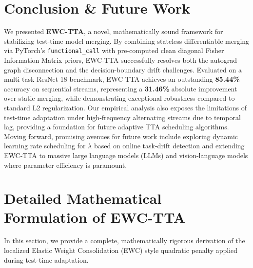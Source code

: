 \documentclass{article}
\theoremstyle{plain}
\theoremstyle{definition}
\theoremstyle{remark}
\begin{document}
\section{Conclusion \& Future Work}
\label{submission-conclusion}

We presented \textbf{EWC-TTA}, a novel, mathematically sound framework for stabilizing test-time model merging. By combining stateless differentiable merging via PyTorch's \texttt{functional\_call} with pre-computed clean diagonal Fisher Information Matrix priors, EWC-TTA successfully resolves both the autograd graph disconnection and the decision-boundary drift challenges. Evaluated on a multi-task ResNet-18 benchmark, EWC-TTA achieves an outstanding \textbf{85.44\%} accuracy on sequential streams, representing a \textbf{31.46\%} absolute improvement over static merging, while demonstrating exceptional robustness compared to standard L2 regularization. Our empirical analysis also exposes the limitations of test-time adaptation under high-frequency alternating streams due to temporal lag, providing a foundation for future adaptive TTA scheduling algorithms. Moving forward, promising avenues for future work include exploring dynamic learning rate scheduling for $\lambda$ based on online task-drift detection and extending EWC-TTA to massive large language models (LLMs) and vision-language models where parameter efficiency is paramount.

\clearpage
\appendix

\section{Detailed Mathematical Formulation of EWC-TTA}
\label{appendix-math}

In this section, we provide a complete, mathematically rigorous derivation of the localized Elastic Weight Consolidation (EWC) style quadratic penalty applied during test-time adaptation.
\end{document}
